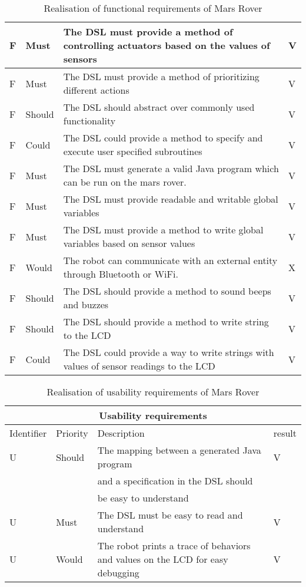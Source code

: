 \begin{table}[H]
\begin{tabular}{|l|l|l|l|}
		F\doTCC & Must & The DSL must provide a method of controlling actuators
			based on the values of sensors & V \\  \hline
		F\doTCC & Must & The DSL must provide a method of prioritizing different
			actions & V \\  \hline
		F\doTCC & Should & The DSL should abstract over commonly used 
			functionality & V\\  \hline
		F\doTCC & Could & The DSL could provide a method to specify and execute
			user specified subroutines & V\\  \hline
		F\doTCC & Must & The DSL must generate a valid Java program which can be
			run on the mars rover. & V\\  \hline
		F\doTCC & Must & The DSL must provide readable and writable global
			variables & V\\  \hline
		F\doTCC & Must & The DSL must provide a method to write global variables
			based on sensor values & V\\  \hline
		F\doTCC & Would & The robot can communicate with an external entity
			through Bluetooth or WiFi. & X \\  \hline
		F\doTCC & Should & The DSL should provide a method to sound beeps and
			buzzes & V \\  \hline
		F\doTCC & Should & The DSL should provide a method to write string to
			the LCD & V\\  \hline
		F\doTCC & Could & The DSL could provide a way to write strings with
			values of sensor readings to the LCD & V\\  
		\hline
	\end{tabular}
\caption{Realisation of functional requirements of Mars Rover}
\label{tbl:endFunctionalReq}
\end{table}

\begin{table}[H]
	\centering
	\begin{tabular}{|l|l|l|l|}
		\hline
		\multicolumn{4}{|c|}{Usability requirements} \\  \hline
		\hline
		Identifier & Priority & Description & result\\  
		\hline
		\hline
		U\doTCC & Should & The mapping between a generated Java program  & V\\  
				&		& and a specification in the DSL should & \\  
				& 		& be easy to understand & \\  \hline
		U\doTCC & Must & The DSL must be easy to read and understand & V \\  \hline
		U\doTCC & Would & The robot prints a trace of behaviors and values on
			the LCD for easy debugging & V\\  
		\hline
	\end{tabular}
\caption{Realisation of usability requirements of Mars Rover}
\label{tbl:endUsabilityReq}
\end{table}


